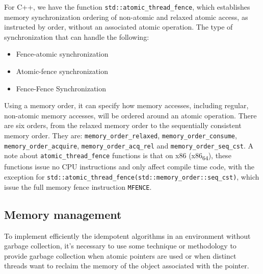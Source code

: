 For C++, we have the function
\texttt{std::atomic\_thread\_fence}\cite{threadFenceCpp2020}, which establishes
memory synchronization ordering of non-atomic and relaxed atomic access, as
instructed by order, without an associated atomic operation. The type of
synchronization that can handle the following:

\begin{itemize}
\item Fence-atomic synchronization
\item Atomic-fence synchronization
\item Fence-Fence Synchronization
\end{itemize}

Using a memory order\cite{memoryOrderCpp2020}, it can specify how memory accesses, including regular, non-atomic memory accesses, will be
ordered around an atomic operation. There are six orders, from the
relaxed memory order to the sequentially consistent memory order. They are:
\texttt{memory\_order\_relaxed}, \texttt{memory\_order\_consume}, \texttt{memory\_order\_acquire},
\texttt{memory\_order\_acq\_rel} and \texttt{memory\_order\_seq\_cst}. A note about
\texttt{atomic\_thread\_fence} functions is that on x86 (x86\textsubscript{64}), these functions
issue no CPU instructions and only affect compile time code, with the exception
for \texttt{std::atomic\_thread\_fence(std::memory\_order::seq\_cst)}, which issue the
full memory fence instruction \texttt{MFENCE}.

\subsection{Memory management}
\label{sec:org1ca9ee9}

To implement efficiently the idempotent algorithms in an environment without
garbage collection, it's necessary to use some technique or methodology to
provide garbage collection when atomic pointers are used or when distinct
threads want to reclaim the memory of the object associated with the pointer.


